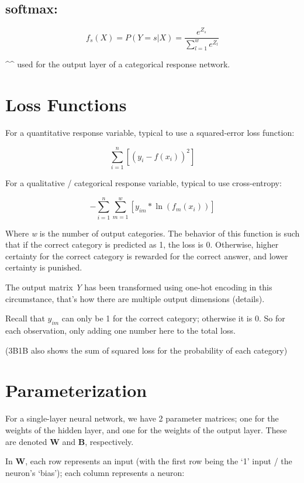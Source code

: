 \documentclass[
]{book}
\begin{document}
\hypertarget{softmax}{%
\subsection{softmax:}\label{softmax}}

\[f_s(X) = P(Y = s | X) = \frac{e^{Z_s}}{\sum_{l = 1}^w e^{Z_l}}\]

\^{}\^{} used for the output layer of a categorical response network.

\hypertarget{loss-functions}{%
\section{Loss Functions}\label{loss-functions}}

For a quantitative response variable, typical to use a squared-error loss function:

\[\sum_{i = 1}^n \left[(y_i - f(x_i))^2\right]\]

For a qualitative / categorical response variable, typical to use cross-entropy:

\[-\sum_{i = 1}^n \sum_{m = 1}^w [y_{im} * \ln (f_m(x_i))]\]

Where \emph{w} is the number of output categories. The behavior of this function is such that if the correct category is predicted as 1, the loss is 0. Otherwise, higher certainty for the correct category is rewarded for the correct answer, and lower certainty is punished.

The output matrix \emph{Y} has been transformed using one-hot encoding in this circumstance, that's how there are multiple output dimensions (details).

Recall that \(y_{im}\) can only be 1 for the correct category; otherwise it is 0. So for each observation, only adding one number here to the total loss.

(3B1B also shows the sum of squared loss for the probability of each category)

\hypertarget{parameterization}{%
\section{Parameterization}\label{parameterization}}

For a single-layer neural network, we have 2 parameter matrices; one for the weights of the hidden layer, and one for the weights of the output layer. These are denoted \textbf{W} and \textbf{B}, respectively.

In \textbf{W}, each row represents an input (with the first row being the `1' input / the neuron's `bias'); each column represents a neuron:
\end{document}
